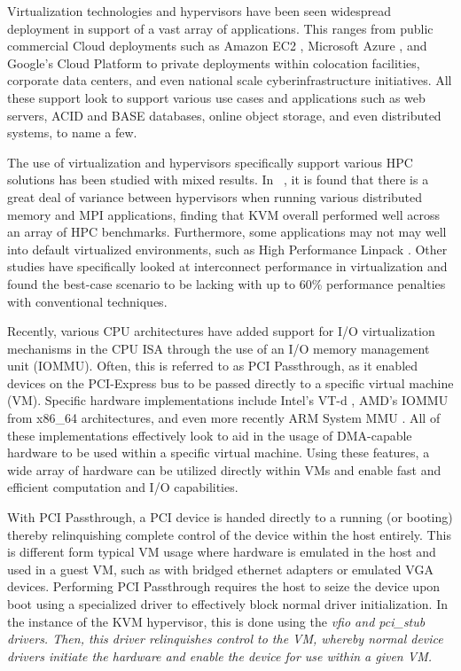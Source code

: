 \documentclass{sigplanconf}
\begin{document}
Virtualization technologies and hypervisors have been seen widespread deployment in support of a vast array of applications.  This ranges from public commercial Cloud deployments such as Amazon EC2 \cite{hazelhurst2008scientific,amazon2010}, Microsoft Azure \cite{jennings2010cloud}, and Google's Cloud Platform \cite{www-google-platform} to private deployments within colocation facilities, corporate data centers, and even national scale cyberinfrastructure initiatives.  All these support look to support various use cases and applications such as web servers, ACID and BASE databases, online object storage, and even distributed systems, to name a few.  

The use of virtualization and hypervisors specifically support various HPC solutions has been studied with mixed results.  In ~\cite{Younge2011cloud}, it is found that there is a great deal of variance between hypervisors when running various distributed memory and MPI applications, finding that KVM overall performed well across an array of HPC benchmarks.  Furthermore, some applications may not may well into default virtualized environments, such as High Performance Linpack \cite{Luszczek:2011:EHC}. Other studies have specifically looked at interconnect performance in virtualization and found the best-case scenario to be lacking \cite{Ramakrishnan2012} with up to 60\% performance penalties with conventional techniques.
 
Recently, various CPU architectures have added support for I/O virtualization mechanisms in the CPU ISA through the use of an I/O memory management unit (IOMMU). Often, this is referred to as PCI Passthrough, as it enabled devices on the PCI-Express bus to be passed directly to a specific virtual machine (VM).  Specific hardware implementations include Intel's VT-d \cite{intelvirtualization}, AMD's IOMMU \cite{amdiommu} from x86\_64 architectures, and even more recently ARM System MMU \cite{armmmu}.  All of these implementations effectively look to aid in the usage of DMA-capable hardware to be used within a specific virtual machine. Using these features, a wide array of hardware can be utilized directly within VMs and enable fast and efficient computation and I/O capabilities.

With PCI Passthrough, a PCI device is handed directly to a running (or booting) thereby relinquishing complete control of the device within the host entirely. This is different form typical VM usage where hardware is emulated in the host and used in a guest VM, such as with bridged ethernet adapters or emulated VGA devices. Performing PCI Passthrough requires the host to seize the device upon boot using a specialized driver to effectively block normal driver initialization. In the instance of the KVM hypervisor, this is done using the \em{vfio} and \em{pci\_stub} drivers. Then, this driver relinquishes control to the VM, whereby normal device drivers initiate the hardware and enable the device for use within a given VM.  
\end{document}
